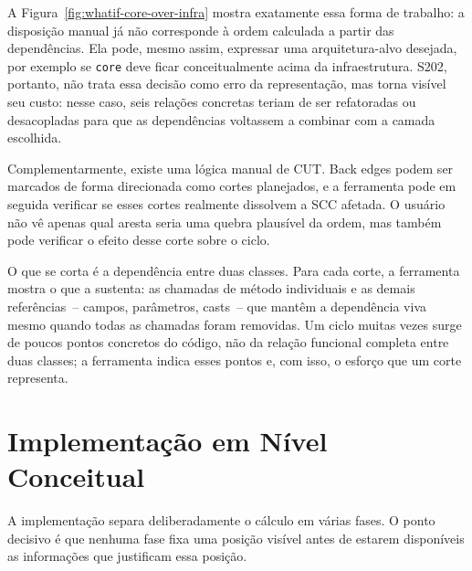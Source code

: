 \documentclass[a4paper,11pt]{article}
\begin{document}
A Figura~\ref{fig:whatif-core-over-infra} mostra exatamente essa forma de
trabalho: a disposi\c{c}\~ao manual j\'a n\~ao corresponde \`a ordem calculada
a partir das depend\^encias. Ela pode, mesmo assim, expressar uma
arquitetura-alvo desejada, por exemplo se \texttt{core} deve ficar
conceitualmente acima da infraestrutura. S202, portanto, n\~ao trata essa
decis\~ao como erro da representa\c{c}\~ao, mas torna vis\'ivel seu custo:
nesse caso, seis rela\c{c}\~oes concretas teriam de ser refatoradas ou
desacopladas para que as depend\^encias voltassem a combinar com a camada
escolhida.

Complementarmente, existe uma l\'ogica manual de CUT. Back edges podem ser
marcados de forma direcionada como cortes planejados, e a ferramenta pode em
seguida verificar se esses cortes realmente dissolvem a SCC afetada. O
usu\'ario n\~ao v\^e apenas qual aresta seria uma quebra plaus\'ivel da ordem,
mas tamb\'em pode verificar o efeito desse corte sobre o ciclo.

O que se corta \'e a depend\^encia entre duas classes. Para cada corte, a
ferramenta mostra o que a sustenta: as chamadas de m\'etodo individuais e as
demais refer\^encias~-- campos, par\^ametros, casts~-- que mant\^em a
depend\^encia viva mesmo quando todas as chamadas foram removidas. Um ciclo
muitas vezes surge de poucos pontos concretos do c\'odigo, n\~ao da
rela\c{c}\~ao funcional completa entre duas classes; a ferramenta indica esses
pontos e, com isso, o esfor\c{c}o que um corte representa.

\section{Implementa\c{c}\~ao em N\'ivel Conceitual}

A implementa\c{c}\~ao separa deliberadamente o c\'alculo em v\'arias fases. O
ponto decisivo \'e que nenhuma fase fixa uma posi\c{c}\~ao vis\'ivel antes de
estarem dispon\'iveis as informa\c{c}\~oes que justificam essa posi\c{c}\~ao.
\end{document}
